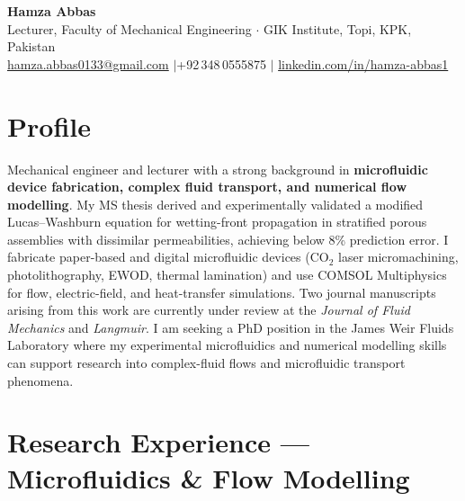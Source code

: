 \documentclass[11pt,a4paper]{article}
\begin{document}

\begin{center}
  {\LARGE\bfseries\color{accent} Hamza Abbas}\\[4pt]
  Lecturer, Faculty of Mechanical Engineering $\cdot$ GIK Institute, Topi, KPK,
  Pakistan\\[3pt]
  \href{mailto:hamza.abbas0133@gmail.com}{hamza.abbas0133@gmail.com}
  \quad$|$\quad +92\,348\,0555875
  \quad$|$\quad
  \href{https://linkedin.com/in/hamza-abbas1}{linkedin.com/in/hamza-abbas1}
\end{center}

\section{Profile}

Mechanical engineer and lecturer with a strong background in
\textbf{microfluidic device fabrication, complex fluid transport, and numerical
flow modelling}. My MS thesis derived and experimentally validated a modified
Lucas--Washburn equation for wetting-front propagation in stratified porous
assemblies with dissimilar permeabilities, achieving below 8\% prediction error.
I fabricate paper-based and digital microfluidic devices (CO$_2$ laser
micromachining, photolithography, EWOD, thermal lamination) and use COMSOL
Multiphysics for flow, electric-field, and heat-transfer simulations. Two
journal manuscripts arising from this work are currently under review at the
\textit{Journal of Fluid Mechanics} and \textit{Langmuir}. I am seeking a
PhD position in the James Weir Fluids Laboratory where my experimental
microfluidics and numerical modelling skills can support research into
complex-fluid flows and microfluidic transport phenomena.

\section{Research Experience — Microfluidics \& Flow Modelling}
\end{document}
